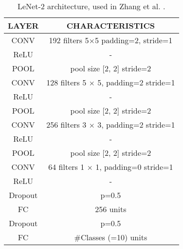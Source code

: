 \begin{table}[]
\centering
\begin{tabular}{|c|c|}
\hline
\textbf{LAYER} & \cellcolor[HTML]{FFFFFF}\textbf{CHARACTERISTICS} \\ \hline
\rowcolor[HTML]{CBCEFB} 
CONV           & 192 filters 5$\times$5 padding=2, stride=1       \\ \hline
\rowcolor[HTML]{EFEFEF} 
ReLU           & -                                                \\ \hline
\rowcolor[HTML]{FFCCC9} 
POOL           & pool size {[}2, 2{]} stride=2                    \\ \hline
\rowcolor[HTML]{CBCEFB} 
CONV           & 128 filters 5 $\times$ 5, padding=2 stride=1     \\ \hline
\rowcolor[HTML]{EFEFEF} 
ReLU           & -                                                \\ \hline
\rowcolor[HTML]{FFCCC9} 
POOL           & pool size {[}2, 2{]} stride=2                    \\ \hline
\rowcolor[HTML]{CBCEFB} 
CONV           & 256 filters 3 $\times$ 3, padding=2 stride=1     \\ \hline
\rowcolor[HTML]{EFEFEF} 
ReLU           & -                                                \\ \hline
\rowcolor[HTML]{FFCCC9} 
POOL           & pool size {[}2, 2{]} stride=2                    \\ \hline
\rowcolor[HTML]{CBCEFB} 
CONV           & 64 filters 1 $\times$ 1, padding=0 stride=1      \\ \hline
\rowcolor[HTML]{EFEFEF} 
ReLU           & -                                                \\ \hline
Dropout        & p=0.5                                            \\ \hline
\rowcolor[HTML]{FBF1A2} 
FC             & 256 units                                        \\ \hline
Dropout        & p=0.5                                            \\ \hline
\rowcolor[HTML]{FBF1A2} 
FC             & \#Classes (=10) units                            \\ \hline
\end{tabular}
\caption{LeNet-2 architecture, used in Zhang et al. \parencite{zhang2015SVD}. }
\label{tab:lenet2}
\end{table}

